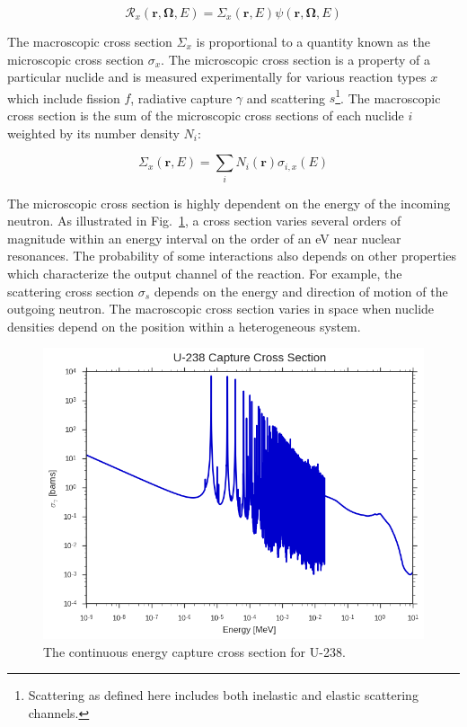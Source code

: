 \begin{dmath}
\label{eqn:chap2-rxn-rates}
\mathcal{R}_{x}(\mathbf{r},\mathbf{\Omega},E) = \Sigma_{x}(\mathbf{r},E) \psi(\mathbf{r},\mathbf{\Omega},E)
\end{dmath}

\noindent The macroscopic cross section $\Sigma_{x}$ is proportional to a quantity known as the microscopic cross section $\sigma_{x}$. The microscopic cross section is a property of a particular nuclide and is measured experimentally for various reaction types $x$ which include fission $f$, radiative capture $\gamma$ and scattering $s$\footnote{Scattering as defined here includes both inelastic and elastic scattering channels.}. The macroscopic cross section is the sum of the microscopic cross sections of each nuclide $i$ weighted by its number density $N_{i}$:

\begin{dmath}
\label{eqn:chap2-macro-xs-sum}
\Sigma_{x}(\mathbf{r},E) = \sum_{i}N_{i}(\mathbf{r})\sigma_{i,x}(E)
\end{dmath}

The microscopic cross section is highly dependent on the energy of the incoming neutron. As illustrated in Fig.~\ref{fig:chap2-u238-xs}, a cross section varies several orders of magnitude within an energy interval on the order of an eV near nuclear resonances. The probability of some interactions also depends on other properties which characterize the output channel of the reaction. For example, the scattering cross section $\sigma_{s}$ depends on the energy and direction of motion of the outgoing neutron. The macroscopic cross section varies in space when nuclide densities depend on the position within a heterogeneous system.

\begin{figure}[H]
  \centering
  \includegraphics[width=0.8\linewidth]{figures/mgxs/u238-capture-xs}
\caption[U-238 capture cross section]{The continuous energy capture cross section for U-238.}
\label{fig:chap2-u238-xs}
\end{figure}
 
